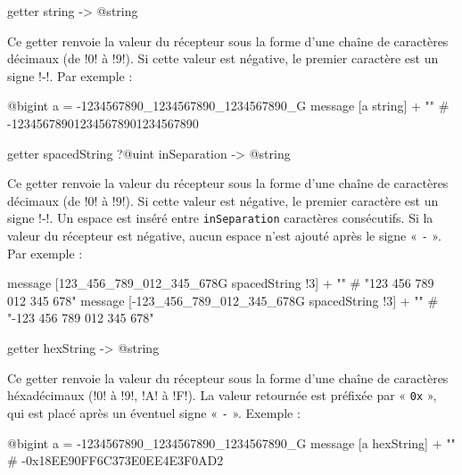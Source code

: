 
\begin{galgas3box}
getter string -> @string
\end{galgas3box}

Ce getter renvoie la valeur du récepteur sous la forme d'une chaîne de caractères décimaux (de \ggst!0! à \ggst!9!). Si cette valeur est négative, le premier caractère est un signe \ggst!-!. Par exemple :

\begin{galgas3}
@bigint a = -1234567890_1234567890_1234567890_G
message [a string] + "\n" # -123456789012345678901234567890
\end{galgas3}




\begin{galgas3box}
getter spacedString ?@uint inSeparation -> @string
\end{galgas3box}

Ce getter renvoie la valeur du récepteur sous la forme d'une chaîne de caractères décimaux (de \ggst!0! à \ggst!9!). Si cette valeur est négative, le premier caractère est un signe \ggst!-!. Un espace est inséré entre \texttt{inSeparation} caractères consécutifs. Si la valeur du récepteur est négative, aucun espace n'est ajouté après le signe « \texttt{-} ». Par exemple :

\begin{galgas3}
message [123_456_789_012_345_678G spacedString !3] + "\n"
# "123 456 789 012 345 678"
message [-123_456_789_012_345_678G spacedString !3] + "\n"
# "-123 456 789 012 345 678"
\end{galgas3}






\begin{galgas3box}
getter hexString -> @string
\end{galgas3box}

Ce getter renvoie la valeur du récepteur sous la forme d'une chaîne de caractères héxadécimaux (\ggst!0! à \ggst!9!, \ggst!A! à \ggst!F!). La valeur retournée est préfixée par « \texttt{0x} », qui est placé après un éventuel signe « \texttt{-} ». Exemple :

\begin{galgas3}
@bigint a = -1234567890_1234567890_1234567890_G
message [a hexString] + "\n" # -0x18EE90FF6C373E0EE4E3F0AD2
\end{galgas3}








